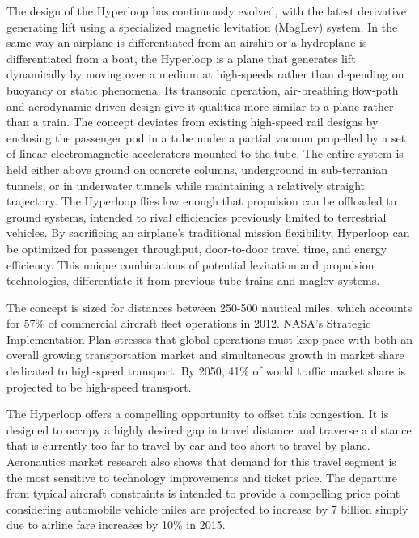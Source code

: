 	The design of the Hyperloop has continuously evolved, with the latest derivative
	generating lift using a specialized magnetic levitation (MagLev) system. 
	In the same way an airplane is differentiated from an airship or a hydroplane is differentiated from
	a boat, the Hyperloop is a plane that generates lift dynamically
	by moving over a medium at high-speeds 
	rather than depending on buoyancy or static phenomena.
	Its transonic operation, air-breathing flow-path and aerodynamic
	driven design give it qualities more similar to a plane rather than a train.
	The concept deviates from existing high-speed rail designs by enclosing the passenger pod in a tube under a partial vacuum
	propelled by a set of linear electromagnetic accelerators
	mounted to the tube. The entire system is held either above ground on concrete
	columns, underground in sub-terranian tunnels, or in underwater tunnels while maintaining a relatively straight trajectory.
	The Hyperloop flies low enough that propulsion can be offloaded to ground systems,
	intended to rival efficiencies previously limited to terrestrial vehicles.
	By sacrificing an airplane's traditional mission flexibility,
	Hyperloop can be optimized for passenger throughput, door-to-door travel time,
	and energy efficiency.
	This unique combinations of potential levitation and propulsion technologies,
	differentiate it from previous tube trains and maglev systems.

	The concept is sized for distances between 250-500 nautical miles,
	which accounts for 57\% of commercial aircraft fleet operations in 2012. NASA's
	Strategic Implementation Plan stresses that global operations must keep pace with both an overall growing
	transportation market and simultaneous growth in market share dedicated to high-speed transport.
	By 2050, 41\% of world traffic market share is projected to be high-speed transport. \cite{Schafer}

	The Hyperloop offers a compelling opportunity to offset this congestion.
	It is designed to occupy a highly desired gap in travel distance and traverse a distance
	that is currently too far to travel by car and too short to travel by plane. Aeronautics market
	research also shows that demand for this travel segment is the most sensitive to
	technology improvements and ticket price.\cite{H. Baik} The departure from typical aircraft constraints
	is intended to provide a compelling price point considering automobile vehicle miles are
	projected to increase by 7 billion simply due to airline
	fare increases by 10\% in 2015.

